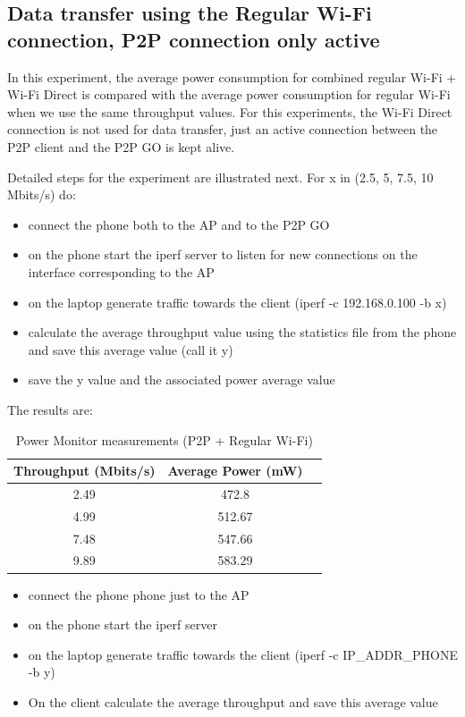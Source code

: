 
\subsection{Data transfer using the Regular Wi-Fi connection, P2P connection only active}
\label{sub-sec:transfer-parallel}

In this experiment, the average power consumption for combined regular Wi-Fi + Wi-Fi Direct is compared with the average power consumption for regular Wi-Fi when we use the same throughput values. For this experiments, the Wi-Fi Direct connection is not used for data transfer, just an active connection between the P2P client and the P2P GO is kept alive.

Detailed steps for the experiment are illustrated next. For x in (2.5, 5, 7.5, 10 Mbits/s) do:
\begin{itemize}
  \item connect the phone both to the AP and to the P2P GO
  \item on the phone start the iperf server to listen for new connections on the interface corresponding to the AP
  \item on the laptop generate traffic towards the client (iperf -c 192.168.0.100 -b x)
  \item calculate the average throughput value using the statistics file from the phone and save this average value (call it y)
  \item save the y value and the associated power average value
\end{itemize}

The results are:

\begin{table}[h!]
  \centering
  \caption{Power Monitor measurements (P2P + Regular Wi-Fi)}
  \label{tab:table1}
  \begin{tabular}{ccc}
    \toprule
    Throughput (Mbits/s) & Average Power (mW) \\
    \midrule
    2.49 & 472.8\\
    4.99 & 512.67\\
    7.48 & 547.66\\
    9.89 & 583.29\\
    \bottomrule
  \end{tabular}
\end{table}

\begin{itemize}
  \item connect the phone phone just to the AP
  \item on the phone start the iperf server
  \item on the laptop generate traffic towards the client (iperf -c IP_ADDR_PHONE -b y)
  \item On the client calculate the average throughput and save this average value
\end{itemize}

